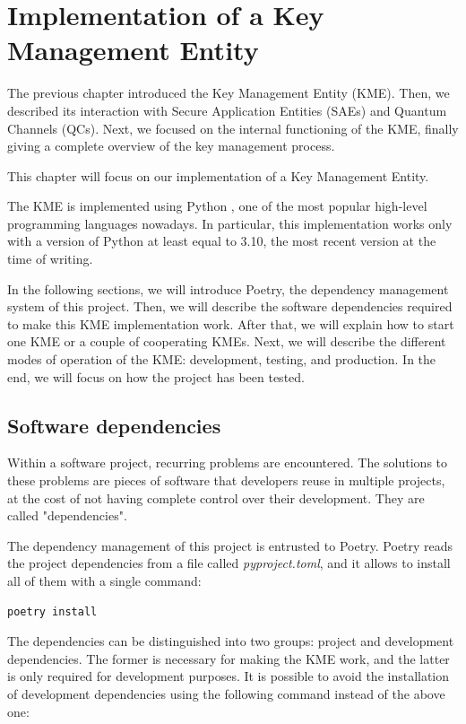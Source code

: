 \chapter{Implementation of a Key Management Entity}
\label{ch:implementation}%

The previous chapter introduced the Key Management Entity (KME). Then, we described its interaction with Secure Application Entities (SAEs) and Quantum Channels (QCs). Next, we focused on the internal functioning of the KME, finally giving a complete overview of the key management process.

This chapter will focus on our implementation of a Key Management Entity.

The KME is implemented using Python \cite{python}, one of the most popular high-level programming languages nowadays. In particular, this implementation works only with a version of Python at least equal to 3.10, the most recent version at the time of writing.

In the following sections, we will introduce Poetry, the dependency management system of this project. Then, we will describe the software dependencies required to make this KME implementation work. After that, we will explain how to start one KME or a couple of cooperating KMEs. Next, we will describe the different modes of operation of the KME: development, testing, and production. In the end, we will focus on how the project has been tested.

\section{Software dependencies}

Within a software project, recurring problems are encountered. The solutions to these problems are pieces of software that developers reuse in multiple projects, at the cost of not having complete control over their development. They are called "dependencies".

The dependency management of this project is entrusted to Poetry. Poetry reads the project dependencies from a file called \textit{pyproject.toml}, and it allows to install all of them with a single command:

\begin{verbatim}
poetry install
\end{verbatim}

The dependencies can be distinguished into two groups: project and development dependencies. The former is necessary for making the KME work, and the latter is only required for development purposes. It is possible to avoid the installation of development dependencies using the following command instead of the above one:

